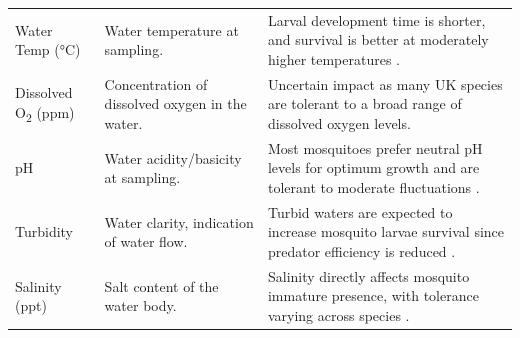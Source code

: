 \documentclass[lineno,sn-basic]{sn-jnl}%
\begin{document}
\begin{table}
\begin{tabular}{p{3cm}p{6cm}p{7cm}}
\addlinespace
Water Temp (°C) & Water temperature at sampling. & Larval development time is shorter, and survival is better at moderately higher temperatures \cite{bayohTemperatureRelatedDuration2004, meretaPhysicochemicalBiologicalCharacterization2013a, rydzaniczSpeciesCompositionSeasonal2003}. \\
\addlinespace
Dissolved O\textsubscript{2} (ppm) & Concentration of dissolved oxygen in the water. & Uncertain impact as many UK species are tolerant to a broad range of dissolved oxygen levels. \\
\addlinespace
pH & Water acidity/basicity at sampling. & Most mosquitoes prefer neutral pH levels for optimum growth and are tolerant to moderate fluctuations \cite{emidiEffectPhysicochemicalParameters2017}. \\
\addlinespace
Turbidity & Water clarity, indication of water flow. & Turbid waters are expected to increase mosquito larvae survival since predator efficiency is reduced \cite{cano-rocabayeraMosquitoLarvaeConsumption2020, utne-palmVisualFeedingFish2002}. \\
\addlinespace
Salinity (ppt) & Salt content of the water body. & Salinity directly affects mosquito immature presence, with tolerance varying across species \cite{medlockReviewInvasiveMosquitoes2012}. \\
\bottomrule
\end{tabular}
\label{tab:vegetation}
\end{table}
\end{document}
